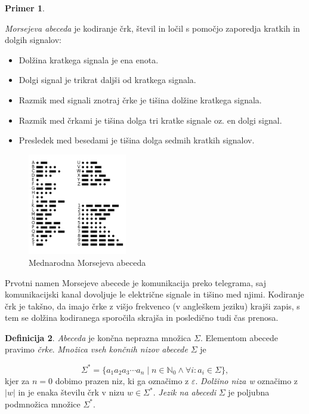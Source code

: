 \documentclass{amsart}
\newcommand{\N}{\mathbb{N}}
\theoremstyle{definition} %
\newtheorem{definicija}{Definicija}[section]
\newtheorem{primer}[definicija]{Primer}
\theoremstyle{plain} %
\begin{document}
\begin{primer}\label{Morse}

    \textit{Morsejeva abeceda} je kodiranje črk, števil in ločil s pomočjo zaporedja kratkih
    in dolgih signalov:

    \begin{itemize}
        \item Dolžina kratkega signala je ena enota.
        \item Dolgi signal je trikrat daljši od kratkega signala.
        \item Razmik med signali znotraj črke je tišina dolžine kratkega signala.
        \item Razmik med črkami je tišina dolga tri kratke signale oz. en dolgi signal.
        \item Presledek med besedami je tišina dolga sedmih kratkih signalov.
    \end{itemize}

    \begin{figure}[h]
        \centering
        \includegraphics[width=4.3cm]{International_Morse_Code.svg.png}
        \caption{Mednarodna Morsejeva abeceda}
        \label{fig:Morse}
    \end{figure}

    Prvotni namen Morsejeve abecede je komunikacija preko telegrama, saj komunikacijski
    kanal dovoljuje le električne signale in tišino med njimi. Kodiranje črk je takšno,
    da imajo črke z višjo frekvenco (v angleškem jeziku) krajši zapis, s tem se dolžina
    kodiranega sporočila skrajša in posledično tudi čas prenosa.

\end{primer}

\begin{definicija}

    \textit{Abeceda} je končna neprazna množica $ \Sigma $. Elementom abecede pravimo \textit{črke}.
    \textit{Množica vseh končnih nizov abecede} $ \Sigma $ je

    \[
        \Sigma^* = \{ a_1 a_2 a_3 \cdots a_n \mid n \in \N_0 \land \forall i: a_i \in \Sigma \}, 
    \]
    kjer za $ n = 0 $ dobimo prazen niz, ki ga označimo z $ \varepsilon $.
    \textit{Dolžino niza w} označimo z $ |w| $ in je enaka številu črk v nizu $ w \in \Sigma^* $.
    \textit{Jezik na abecedi} $ \Sigma $ je poljubna podmnožica množice $ \Sigma^* $. 

\end{definicija}
\end{document}

